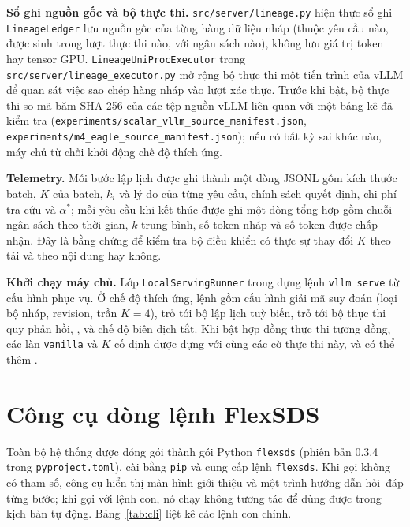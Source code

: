 \textbf{Sổ ghi nguồn gốc và bộ thực thi.} \texttt{src/server/lineage.py} hiện thực sổ ghi \texttt{LineageLedger} lưu nguồn gốc của từng hàng dữ liệu nháp (thuộc yêu cầu nào, được sinh trong lượt thực thi nào, với ngân sách nào), không lưu giá trị token hay tensor GPU. \texttt{LineageUniProcExecutor} trong \texttt{src/server/lineage\_executor.py} mở rộng bộ thực thi một tiến trình của vLLM để quan sát việc sao chép hàng nháp vào lượt xác thực. Trước khi bật, bộ thực thi so mã băm SHA-256 của các tệp nguồn vLLM liên quan với một bảng kê đã kiểm tra (\texttt{experiments/scalar\_vllm\_source\_manifest.json}, \texttt{experiments/m4\_eagle\_source\_manifest.json}); nếu có bất kỳ sai khác nào, máy chủ từ chối khởi động chế độ thích ứng.

\textbf{Telemetry.} Mỗi bước lập lịch được ghi thành một dòng JSONL gồm kích thước batch, $K$ của batch, $k_i$ và lý do của từng yêu cầu, chính sách quyết định, chi phí tra cứu và $\alpha^\ast$; mỗi yêu cầu khi kết thúc được ghi một dòng tổng hợp gồm chuỗi ngân sách theo thời gian, $k$ trung bình, số token nháp và số token được chấp nhận. Đây là bằng chứng để kiểm tra bộ điều khiển có thực sự thay đổi $K$ theo tải và theo nội dung hay không.

\textbf{Khởi chạy máy chủ.} Lớp \texttt{LocalServingRunner} trong  dựng lệnh \texttt{vllm serve} từ cấu hình phục vụ. Ở chế độ thích ứng, lệnh gồm cấu hình giải mã suy đoán (loại bộ nháp, revision, trần $K=4$),  trỏ tới bộ lập lịch tuỳ biến,  trỏ tới bộ thực thi quy phản hồi, ,  và chế độ biên dịch tắt. Khi bật hợp đồng thực thi tương đồng, các làn \texttt{vanilla} và $K$ cố định được dựng với cùng các cờ thực thi này, và có thể thêm .

\section{Công cụ dòng lệnh FlexSDS}
\label{sec:ht-cli}

Toàn bộ hệ thống được đóng gói thành gói Python \texttt{flexsds} (phiên bản 0.3.4 trong \texttt{pyproject.toml}), cài bằng \texttt{pip} và cung cấp lệnh \texttt{flexsds}. Khi gọi không có tham số, công cụ hiển thị màn hình giới thiệu và một trình hướng dẫn hỏi--đáp từng bước; khi gọi với lệnh con, nó chạy không tương tác để dùng được trong kịch bản tự động. Bảng~\ref{tab:cli} liệt kê các lệnh con chính.

